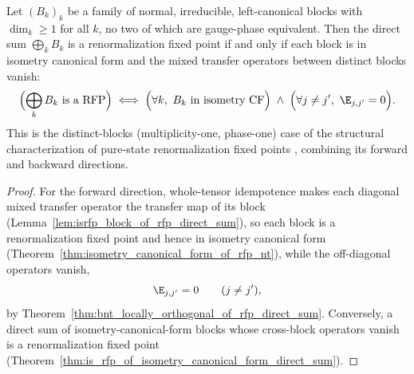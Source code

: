 \begin{theorem}%
    \label{thm:rfp_directSumTensor_iff}
    \leanok
    Let $(B_k)_k$ be a family of normal, irreducible, left-canonical blocks with
    $\dim_k \ge 1$ for all $k$, no two of which are gauge-phase equivalent. Then
    the direct sum $\bigoplus_k B_k$ is a renormalization fixed point if and only
    if each block is in isometry canonical form and the mixed transfer operators
    between distinct blocks vanish:
    \[
        \Bigl(\bigoplus_k B_k \text{ is a RFP}\Bigr)
        \iff
        \Bigl(\forall k,\ B_k \text{ in isometry CF}\Bigr)
        \;\wedge\;
        \Bigl(\forall j\ne j',\ \E_{j,j'} = 0\Bigr).
    \]
    This is the distinct-blocks (multiplicity-one, phase-one) case of the
    structural characterization of pure-state renormalization fixed points
    \cite[Theorem~III]{Cirac2016MPDO_arXiv}, combining its forward and backward
    directions.
\end{theorem}
\begin{proof}\leanok
    For the forward direction, whole-tensor idempotence makes each diagonal mixed
    transfer operator the transfer map of its block
    (Lemma~\ref{lem:isrfp_block_of_rfp_direct_sum}), so each block is a
    renormalization fixed point and hence in isometry canonical form
    (Theorem~\ref{thm:isometry_canonical_form_of_rfp_nt}), while the off-diagonal
    operators vanish,
    \[
        \E_{j,j'} = 0 \qquad (j\ne j'),
    \]
    by Theorem~\ref{thm:bnt_locally_orthogonal_of_rfp_direct_sum}. Conversely, a
    direct sum of isometry-canonical-form blocks whose cross-block operators
    vanish is a renormalization fixed point
    (Theorem~\ref{thm:is_rfp_of_isometry_canonical_form_direct_sum}).
\end{proof}

